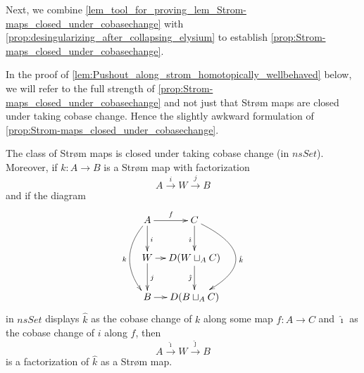 \noindent Next, we combine \cref{lem_tool_for_proving_lem_Strom-maps_closed_under_cobasechange} with \cref{prop:desingularizing_after_collapsing_elysium} to establish \cref{prop:Strom-maps_closed_under_cobasechange}.

In the proof of \cref{lem:Pushout_along_strom_homotopically_wellbehaved} below, we will refer to the full strength of \cref{prop:Strom-maps_closed_under_cobasechange} and not just that Str\o m maps are closed under taking cobase change. Hence the slightly awkward formulation of \cref{prop:Strom-maps_closed_under_cobasechange}.
\begin{proposition}\label{prop:Strom-maps_closed_under_cobasechange}
The class of Str\o m maps is closed under taking cobase change (in $nsSet$). Moreover, if $k:A\to B$ is a Str\o m map with factorization
\[A\xrightarrow{i} W\xrightarrow{j} B\]
and if the diagram
\begin{displaymath}
\xymatrix@C=1em{
  A \ar@/_1.5pc/[dd]_k \ar[r]^f \ar[d]^i & C \ar[d]_{\hat{\imath }} \ar@/^3.5pc/[dd]^{\hat{k} } \\
  W \ar[r] \ar[d]^j & D(W\sqcup _AC) \ar[d]_{\hat{\jmath }} \\
  B \ar[r] & D(B\sqcup _AC) \\
}
\end{displaymath}
in $nsSet$ displays $\hat{k}$ as the cobase change of $k$ along some map $f:A\to C$ and $\hat{\imath }$ as the cobase change of $i$ along $f$, then
\[A\xrightarrow{\hat{\imath }} W\xrightarrow{\hat{\jmath } } B\]
is a factorization of $\hat{k}$ as a Str\o m map.
\end{proposition}
